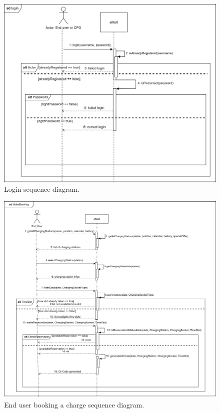 \begin{figure}[H]
    \centering
    \includegraphics[width=\textwidth]{images/sd_login.png}
    \caption{Login sequence diagram.}
    \label{fig:sd_login}
\end{figure}
\begin{figure}[H]
    \centering
    \includegraphics[width=\textwidth]{images/sd_makeBooking.png}
    \caption{End user booking a charge sequence diagram.}
    \label{fig:sd_booking_charge}
\end{figure}
